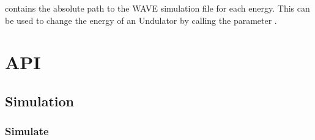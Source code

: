 \documentclass[letterpaper,10pt,english]{sphinxmanual}
\begin{document}
\sphinxAtStartPar
{} contains the absolute path to the WAVE simulation file for each energy.
This can be used to change the energy of an Undulator by calling the parameter .

\sphinxstepscope


\chapter{API}
\label{\detokenize{API:api}}\label{\detokenize{API::doc}}

\section{Simulation}
\label{\detokenize{API:simulation}}

\subsection{Simulate}
\label{\detokenize{API:simulate}}
\end{document}
